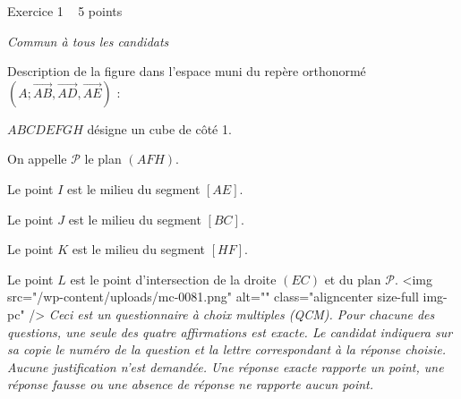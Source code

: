 
%
\begin{h2}Exercice 1   5 points\end{h2}
\textit{Commun à tous les candidats}
\par
Description de la figure dans l'espace muni du repère orthonormé  $\left(A ;  \overrightarrow{AB}, \overrightarrow{AD}, \overrightarrow{AE}\right)$  :
\par
$ABCDEFGH$ désigne un cube de côté 1.
\par
On appelle $\mathscr P$ le plan $\left(AFH\right)$.
\par
Le point $I$ est le milieu du segment $\left[AE\right]$.
\par
Le point $J$ est le milieu du segment $\left[BC\right]$.
\par
Le point $K$ est le milieu du segment $\left[HF\right]$.
\par
Le point $L$ est le point d'intersection de la droite $\left(EC\right)$ et du plan $\mathscr P$.
<img src="/wp-content/uploads/mc-0081.png" alt="" class="aligncenter size-full  img-pc" />
\textit{Ceci est un questionnaire à choix multiples (QCM). Pour chacune des questions, une seule des quatre affirmations est exacte. Le candidat indiquera sur sa copie le numéro de la question et la lettre correspondant à la réponse choisie. Aucune justification n'est demandée. Une réponse exacte rapporte un point, une réponse fausse ou une absence de réponse ne rapporte aucun point.}
